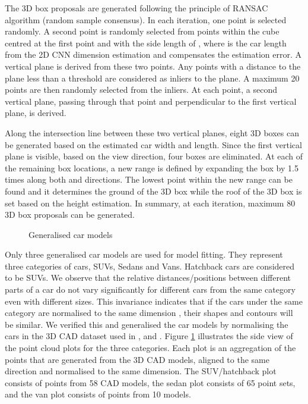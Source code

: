 \documentclass[letterpaper, 10 pt, conference]{ieeeconf}  \usepackage[
\begin{document}
The 3D box proposals are generated following the principle of RANSAC algorithm (random sample consensus). In each iteration, one point is selected randomly. A second point is randomly selected from points within the cube centred at the first point and with the side length of , where  is the car length from the 2D CNN dimension estimation and  compensates the estimation error. A vertical plane is derived from these two points. Any points with a distance to the plane less than a threshold are considered as inliers to the plane. A maximum 20 points are then randomly selected from the inliers. At each point, a second vertical plane, passing through that point and perpendicular to the first vertical plane, is derived. 

Along the intersection line between these two vertical planes, eight 3D boxes can be generated based on the estimated car width and length. Since the first vertical plane is visible, based on the view direction, four boxes are eliminated. At each of the remaining box locations, a new range is defined by expanding the box by 1.5 times along both  and  directions. The lowest point within the new range can be found and it determines the ground of the 3D box while the roof of the 3D box is set based on the height estimation. In summary, at each iteration, maximum 80 3D box proposals can be generated.

\begin{figure}[h]
\centering
    \caption{Generalised car models}
    \label{fig:Generalised car models}
\end{figure}

Only three generalised car models are used for model fitting. They represent three categories of cars, SUVs, Sedans and Vans. Hatchback cars are considered to be SUVs. We observe that the relative distances/positions between different parts of a car do not vary significantly for different cars from the same category even with different sizes. This invariance indicates that if the cars under the same category are normalised to the same dimension , their shapes and contours will be similar. We verified this and generalised the car models by normalising the cars in the 3D CAD dataset used in \cite{deepmanta_cvpr17}, \cite{fidler20123d} and \cite{chen2014beat}. Figure \ref{fig:Generalised car models} illustrates the side view of the point cloud plots for the three categories. Each plot is an aggregation of the points that are generated from the 3D CAD models, aligned to the same direction and normalised to the same dimension. The SUV/hatchback plot consists of points from 58 CAD models, the sedan plot consists of 65 point sets, and the van plot consists of points from 10 models.
\end{document}
